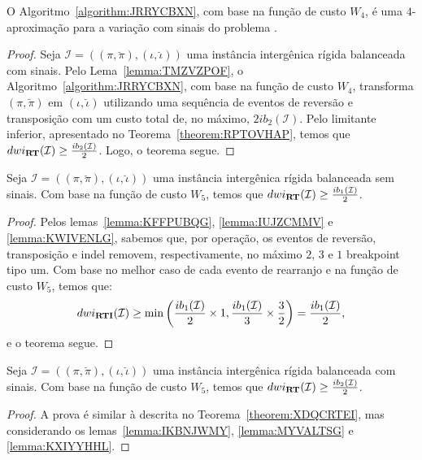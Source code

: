 \begin{theorem}\label{theorem:IUDGQWGI}
O Algoritmo~\ref{algorithm:JRRYCBXN}, com base na função de custo $W_4$, é uma $4$-aproximação para a variação com sinais do problema \SbWIRT{}.
\end{theorem}
\begin{proof}
Seja $\mathcal{I} = ((\pi,\breve\pi),(\iota,\breve\iota))$ uma instância intergênica rígida balanceada com sinais. Pelo Lema~\ref{lemma:TMZVZPOF}, o Algoritmo~\ref{algorithm:JRRYCBXN}, com base na função de custo $W_4$, transforma $(\pi,\breve\pi)$ em $(\iota,\breve\iota)$ utilizando uma sequência de eventos de reversão e transposição com um custo total de, no máximo, $2ib_2(\mathcal{I})$. Pelo limitante inferior, apresentado no Teorema~\ref{theorem:RPTOVHAP}, temos que $dwi_{\textbf{RT}}(\mathcal{I}) \ge \frac{ib_2(\mathcal{I})}{2}$. Logo, o teorema segue.
\end{proof}

\begin{theorem}\label{theorem:XDQCRTEI}
Seja $\mathcal{I} = ((\pi,\breve\pi),(\iota,\breve\iota))$ uma instância intergênica rígida balanceada sem sinais. Com base na função de custo $W_5$, temos que $dwi_{\textbf{RT}}(\mathcal{I}) \ge \frac{ib_1(\mathcal{I})}{2}$.
\begin{proof}
Pelos lemas~\ref{lemma:KFFPUBQG}, \ref{lemma:IUJZCMMV} e \ref{lemma:KWIVENLG}, sabemos que, por operação, os eventos de reversão, transposição e indel removem, respectivamente, no máximo $2$, $3$ e $1$ breakpoint tipo um. Com base no melhor caso de cada evento de rearranjo e na função de custo $W_5$, temos que:
$$dwi_{\textbf{RTI}}(\mathcal{I}) \ge \min\left(\frac{ib_1(\mathcal{I})}{2} \times 1,\frac{ib_1(\mathcal{I})}{3} \times \frac{3}{2}\right) = \frac{ib_1(\mathcal{I})}{2},$$ e o teorema segue.
\end{proof}
\end{theorem}

\begin{theorem}\label{theorem:MCKFPIOP}
Seja $\mathcal{I} = ((\pi,\breve\pi),(\iota,\breve\iota))$ uma instância intergênica rígida balanceada com sinais. Com base na função de custo $W_5$, temos que $dwi_{\textbf{RT}}(\mathcal{I}) \ge \frac{ib_2(\mathcal{I})}{2}$.
\begin{proof}
A prova é similar à descrita no Teorema~\ref{theorem:XDQCRTEI}, mas considerando os lemas~\ref{lemma:IKBNJWMY}, \ref{lemma:MYVALTSG} e \ref{lemma:KXIYYHHL}.
\end{proof}
\end{theorem}

